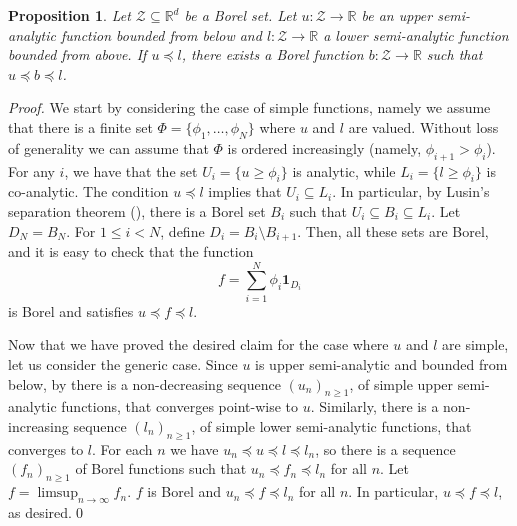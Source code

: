 \documentclass[3p, authoryear, 10pt]{elsarticle}%
\newcommand{\one}[1]{\mathbf{1}_{#1}}
\newcommand{\R}{\mathbb R}
\newcommand{\Z}{\mathcal Z}
\newtheorem{proposition}{Proposition}
\begin{document}
\begin{proposition}\label{prop:ufl}
    Let $\Z\subseteq\R^d$ be a Borel set. Let $u:\Z\to\R$ be an upper semi-analytic function bounded from below and $l:\Z\to\R$ a lower semi-analytic function bounded from above. If $u\preceq l$, there exists a Borel function $b:\Z\to\R$ such that $u\preceq b\preceq l$. 
\end{proposition}
\begin{proof}
    We start by considering the case of simple functions, namely we assume that there is a finite set $\Phi = \{\phi_1,\dots,\phi_N\}$ where $u$ and $l$ are valued. Without loss of generality we can assume that $\Phi$ is ordered increasingly (namely, $\phi_{i+1}>\phi_i$). For any $i$, we have that the set $U_i = \{u\geq \phi_i\}$ is analytic, while $L_i = \{l\geq\phi_i\}$ is co-analytic. The condition $u\preceq l$ implies that $U_i\subseteq L_i$. In particular, by Lusin's separation theorem (), there is a Borel set $B_i$ such that $U_i\subseteq B_i\subseteq L_i$. Let $D_N = B_N$. For $1\leq i<N$, define $D_i = B_{i}\setminus B_{i+1}$. Then, all these sets are Borel, and it is easy to check that the function $$f = \sum_{i=1}^N\phi_i \one{D_i}$$ is Borel and satisfies $u\preceq f\preceq l$. 

    Now that we have proved the desired claim for the case where $u$ and $l$ are simple, let us consider the generic case. Since $u$ is upper semi-analytic and bounded from below, by  there is a non-decreasing sequence $(u_n)_{n\geq 1}$, of simple upper semi-analytic functions, that converges point-wise to $u$. Similarly, there is a non-increasing sequence $(l_n)_{n\geq 1}$, of simple lower semi-analytic functions, that converges to $l$. For each $n$ we have $u_n\preceq u\preceq l\preceq l_n$, so there is a sequence $(f_n)_{n\geq 1}$ of Borel functions such that $u_n\preceq f_n\preceq l_n$ for all $n$. Let $f = \limsup_{n\to\infty} f_n$. $f$ is Borel and $u_n\preceq f\preceq l_n$ for all $n$. In particular, $u\preceq f\preceq l$, as desired.\qed 
\end{proof}
\end{document}
